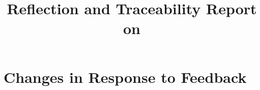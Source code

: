 \documentclass{article}
\title{Reflection and Traceability Report on \progname}
\author{\authname}
\date{}
\begin{document}
\maketitle


\section{Changes in Response to Feedback}

\end{document}

